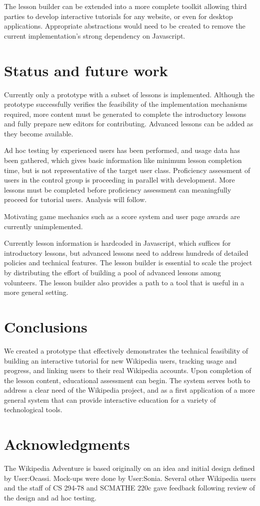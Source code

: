 \documentclass{acm_proc_article-sp}
\begin{document}
The lesson builder can be extended into a more complete toolkit allowing third parties to develop interactive tutorials for any website, or even for desktop applications. Appropriate abstractions would need to be created to remove the current implementation's strong dependency on Javascript.

\section{Status and future work}

Currently only a prototype with a subset of lessons is implemented. Although the prototype successfully
verifies the feasibility of the implementation mechanisms required, more content
must be generated to complete the introductory lessons and fully prepare new
editors for contributing. Advanced lessons can be added as they become available.

Ad hoc testing by experienced users has been performed, and usage data has been
gathered, which gives basic information like minimum lesson completion time,
but is not representative of the target user class. Proficiency assessment of
users in the control group is proceeding in parallel with development. More lessons must
be completed before proficiency assessment can meaningfully proceed for tutorial users.
Analysis will follow.

Motivating game mechanics such as a score system and user page awards are currently
unimplemented.

Currently lesson information is hardcoded in Javascript, which suffices for introductory
lessons, but advanced lessons need to address hundreds of detailed policies and
technical features. The lesson builder is essential to scale the project by distributing
the effort of building  a pool of advanced lessons among volunteers. The lesson
builder also provides a path to a tool that is useful in a more general setting.

\section{Conclusions}

We created a prototype that effectively demonstrates the technical feasibility
of building an interactive tutorial for new Wikipedia users, tracking usage and progress,
and linking users to their real Wikipedia accounts. Upon completion
of the lesson content, educational assessment can begin. The system serves both
to address a clear need of the Wikipedia project, and as a first application of a
more general system that can provide interactive education for a variety of
technological tools.

\section{Acknowledgments}
The Wikipedia Adventure is based originally on an idea and
initial design defined by User:Ocassi. Mock-ups
were done by User:Sonia. Several
other Wikipedia users and the staff of
CS 294-78 and SCMATHE 220c gave feedback following
review of the design and ad hoc testing.


\end{document}
